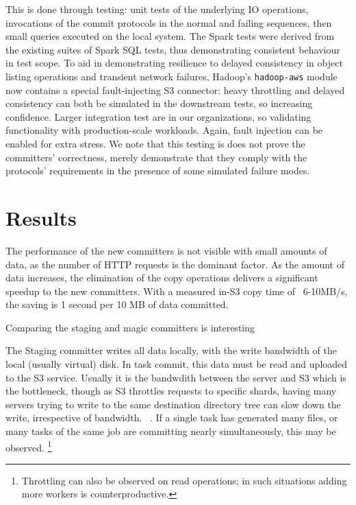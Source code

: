 \documentclass[conference]{IEEEtran}
\begin{document}
This is done through testing: unit tests of the underlying IO operations,
invocations of the commit protocols in the normal and failing sequences,
then small queries executed on the local system.
The Spark tests were derived from the existing suites of Spark SQL tests,
thus demonstrating consistent behaviour in test scope.
To aid in demonstrating resilience to delayed consistency in object listing
operations and transient network failures, Hadoop's \texttt{hadoop-aws} module
now contains a special fault-injecting S3 connector: heavy throttling and
delayed consistency can both be simulated in the downstream tests, so
increasing confidence.
Larger integration test are in our organizations, so validating functionality
with production-scale workloads.
Again, fault injection can be enabled for extra stress.
We note that this testing is does not prove the committers' correctness,
merely demonstrate that they comply with the protocols' requirements in
the presence of some simulated failure modes.




\section{Results}
\label{sec:results}


The performance of the new committers is not visible with small amounts
of data, as the number of HTTP requests is the dominant factor.
As the amount of data increases, the elimination of the copy operations
delivers a significant speedup to the new committers.
With a measured in-S3 copy time of ~6-10MB/s, the saving is 1 second per 10 MB
of data committed.

Comparing the staging and magic committers is interesting

The Staging committer writes all data locally, with the write bandwidth
of the local (usually virtual) disk.
In task commit, this data must be read and uploaded to the S3 service.
Usually it is the bandwdith between the server and S3 which is the bottleneck,
though as S3 throttles requests to specific shards, having many servers trying
to write to the same destination directory tree can slow down the write, irrespective
of bandwidth.
\ \cite{AWS-S3-throttling}.
If a single task has generated many files, or many tasks of the same job are
committing nearly simultaneously, this may be observed.
\footnote{Throttling can also be observed on read operations;
in such situations adding more workers is counterproductive.}
\end{document}
